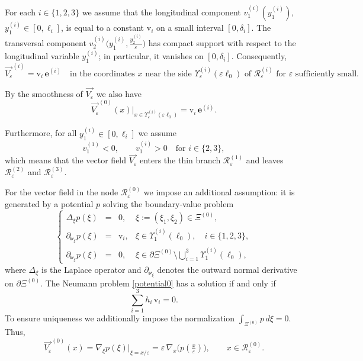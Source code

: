 \documentclass[reqno]{amsart}            %
\numberwithin{equation}{section}
\begin{document}
	For each $i\in\{1,2,3\}$ we assume that the longitudinal component
	$v^{(i)}_1(y_1^{(i)})$, $y_1^{(i)}\in[0,\ell_i]$, is equal to a constant
	$\mathrm{v}_i$ on a small interval $[0,\delta_i]$.
	The transversal component
	$v^{(i)}_2\big(y_1^{(i)},\tfrac{y_2^{(i)}}{\varepsilon}\big)$
	has compact support with respect to the longitudinal variable $y_1^{(i)}$;
	in particular, it vanishes on $[0,\delta_i]$.
	Consequently,
	\[
	\overrightarrow{V_\varepsilon}^{(i)}
	=\mathrm{v}_i\,\mathbf{e}^{(i)}
	\quad\text{in the coordinates $x$ near the side }
	\Upsilon_\varepsilon^{(i)}(\varepsilon\ell_0)
	\text{ of }\mathcal{R}_\varepsilon^{(i)}
	\text{ for $\varepsilon$ sufficiently small}.
	\]
	
	By the smoothness of $\overrightarrow{V_\varepsilon}$ we also have
	\begin{equation}\label{V_1}
		\overrightarrow{V_\varepsilon}^{(0)}(x)\big|_{x\in\Upsilon_\varepsilon^{(i)}(\varepsilon\ell_0)}
		=\mathrm{v}_i\,\mathbf{e}^{(i)}.
	\end{equation}
	
	Furthermore, for all $y_1^{(i)}\in[0,\ell_i]$ we assume
	\begin{equation}\label{V_2}
		v^{(1)}_1<0,
		\qquad
		v^{(i)}_1>0\quad\text{for }i\in\{2,3\},
	\end{equation}
	which means that the vector field $\overrightarrow{V_\varepsilon}$ enters the
	thin branch $\mathcal{R}_\varepsilon^{(1)}$ and leaves
	$\mathcal{R}_\varepsilon^{(2)}$ and $\mathcal{R}_\varepsilon^{(3)}$.
	
	For the vector field in the node $\mathcal{R}_\varepsilon^{(0)}$ we impose an
	additional assumption: it is generated by a potential $p$
	solving the boundary-value problem
	\begin{equation}\label{potential0}
		\left\{
		\begin{array}{rcll}
			\Delta_\xi p(\xi) &=& 0, & \xi:=(\xi_1,\xi_2)\in\Xi^{(0)},
			\\[2pt]
			\partial_{\boldsymbol{\nu}_\xi}p(\xi) &=& \mathrm{v}_i,
			& \xi\in\Upsilon^{(i)}_1(\ell_0),\quad i\in\{1,2,3\},
			\\[2pt]
			\partial_{\boldsymbol{\nu}_\xi}p(\xi) &=& 0,
			& \xi\in\partial\Xi^{(0)}\setminus\bigcup_{i=1}^3\Upsilon^{(i)}_1(\ell_0),
		\end{array}
		\right.
	\end{equation}
	where $\Delta_\xi$ is the Laplace operator and
	$\partial_{\boldsymbol{\nu}_\xi}$ denotes the outward normal derivative on
	$\partial\Xi^{(0)}$.
	The Neumann problem \eqref{potential0} has a solution if and only if
	\begin{equation}\label{cond_1}
		\sum_{i=1}^{3} h_i\,\mathrm{v}_i = 0.
	\end{equation}
	To ensure uniqueness we additionally impose the normalization
	$\int_{\Xi^{(0)}} p\,d\xi = 0$.
	Thus,
	\begin{equation}\label{field_0}
		\overrightarrow{V_\varepsilon}^{(0)}(x)
		=\nabla_\xi p(\xi)\big|_{\xi=x/\varepsilon}
		=\varepsilon\,\nabla_x\big(p(\tfrac{x}{\varepsilon})\big),
		\qquad x\in\mathcal{R}_\varepsilon^{(0)}.
	\end{equation}
	
\end{document}
